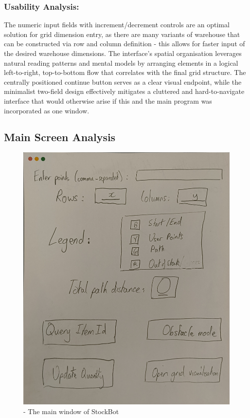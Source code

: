 \subsubsection{Usability Analysis:}

The numeric input fields with increment/decrement controls are an optimal solution for grid dimension entry, as there are many variants of warehouse that can be constructed via row and column definition - this allows for faster input of the desired warehouse dimensions. \newline The interface's spatial organisation leverages natural reading patterns and mental models by arranging elements in a logical left-to-right, top-to-bottom flow that correlates with the final grid structure. \newline The centrally positioned continue button serves as a clear visual endpoint, while the minimalist two-field design effectively mitigates a cluttered and hard-to-navigate interface that would otherwise arise if this and the main program was incorporated as one window.

\newpage

\subsection{Main Screen Analysis}

\begin{figure}[!htbp]
    \centering
    \includegraphics[width=1\linewidth]{Images/GUI.jpg}
    \caption{- The main window of StockBot}
\end{figure}

